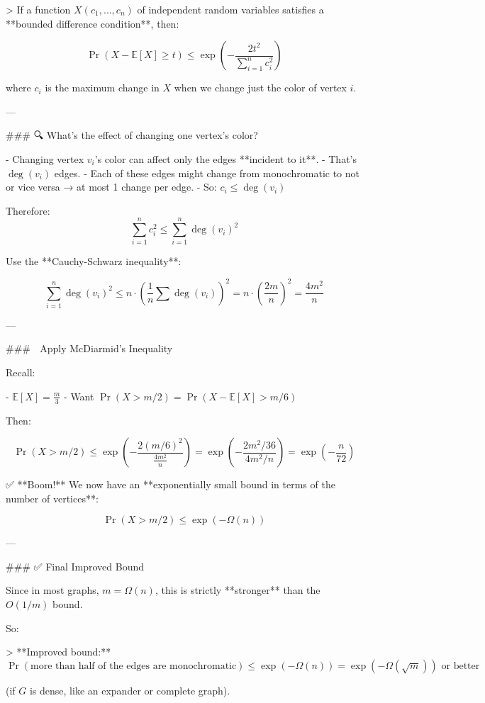 > If a function \( X(c_1, \dots, c_n) \) of independent random variables satisfies a **bounded difference condition**, then:

\[
\Pr(X - \mathbb{E}[X] \ge t) \le \exp\left(-\frac{2t^2}{\sum_{i=1}^n c_i^2}\right)
\]

where \( c_i \) is the maximum change in \( X \) when we change just the color of vertex \( i \).

---

### 🔍 What's the effect of changing one vertex's color?

- Changing vertex \( v_i \)'s color can affect only the edges **incident to it**.
- That's \( \deg(v_i) \) edges.
- Each of these edges might change from monochromatic to not or vice versa → at most 1 change per edge.
- So: \( c_i \le \deg(v_i) \)

Therefore:
\[
\sum_{i=1}^n c_i^2 \le \sum_{i=1}^n \deg(v_i)^2
\]

Use the **Cauchy-Schwarz inequality**:

\[
\sum_{i=1}^n \deg(v_i)^2 \le n \cdot \left(\frac{1}{n} \sum \deg(v_i)\right)^2 = n \cdot \left(\frac{2m}{n}\right)^2 = \frac{4m^2}{n}
\]

---

### 🚀 Apply McDiarmid's Inequality

Recall:

- \( \mathbb{E}[X] = \frac{m}{3} \)
- Want \( \Pr(X > m/2) = \Pr(X - \mathbb{E}[X] > m/6) \)

Then:

\[
\Pr(X > m/2) \le \exp\left(-\frac{2 (m/6)^2}{\frac{4m^2}{n}} \right)
= \exp\left(-\frac{2 m^2 / 36}{4m^2 / n} \right)
= \exp\left(-\frac{n}{72}\right)
\]

✅ **Boom!** We now have an **exponentially small bound in terms of the number of vertices**:

\[
\boxed{\Pr(X > m/2) \le \exp(-\Omega(n))}
\]

---

### ✅ Final Improved Bound

Since in most graphs, \( m = \Omega(n) \), this is strictly **stronger** than the \( O(1/m) \) bound.

So:

> **Improved bound:**  
\[
\Pr(\text{more than half of the edges are monochromatic}) \le \exp(-\Omega(n)) = \exp\left(-\Omega\left(\sqrt{m}\right)\right) \text{ or better}
\]

(if \( G \) is dense, like an expander or complete graph).

